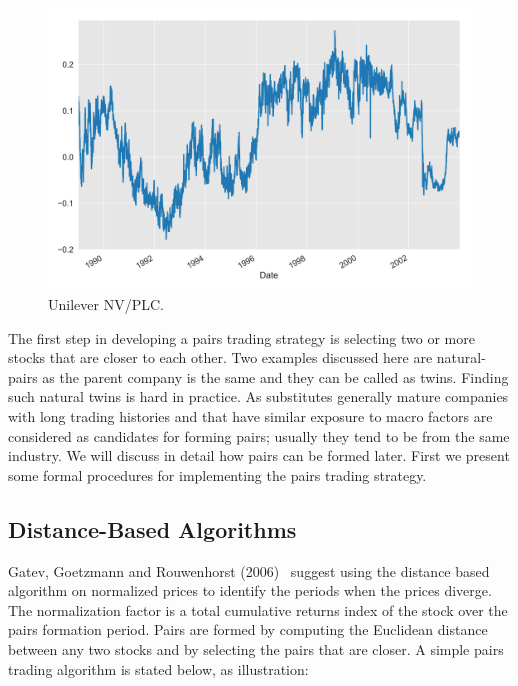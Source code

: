 	\begin{figure}[!ht]
	\centering
	\includegraphics[width=\textwidth]{chapters/chapter_stat_ts/figures/rd_un.png}
	\caption{Unilever NV/PLC. \label{fig:3nvplc}}
	\end{figure}

The first step in developing a pairs trading strategy is selecting two or more stocks that are closer to each other. Two examples discussed here are natural-pairs as the parent company is the same and they can be called as twins. Finding such natural twins is hard in practice. As substitutes generally mature companies with long trading histories and that have similar exposure to macro factors are considered as candidates for forming pairs; usually they tend to be from the same industry. We will discuss in detail how pairs can be formed later. First we present some formal procedures for implementing the pairs trading strategy.


\subsection{Distance-Based Algorithms}

Gatev, Goetzmann and Rouwenhorst (2006)~\cite{ggr} suggest using the distance based algorithm on normalized prices to identify the periods when the prices diverge. The normalization factor is a total cumulative returns index of the stock over the pairs formation period. Pairs are formed by computing the Euclidean distance between any two stocks and by selecting the pairs that are closer. A simple pairs trading algorithm is stated below, as illustration: \twomedskip

